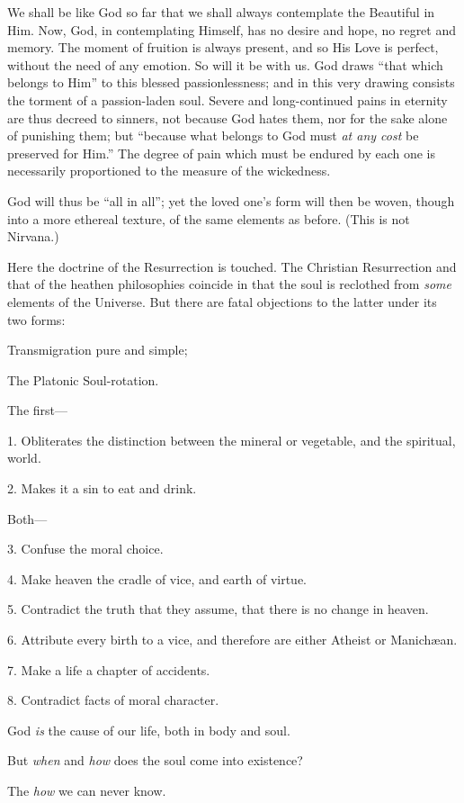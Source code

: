 We shall be like God so far that we shall always contemplate the Beautiful in Him. Now, God, in contemplating Himself, has no desire and hope, no regret and memory. The moment of fruition is always present, and so His Love is perfect, without the need of any emotion. So will it be with us. God draws “that which belongs to Him” to this blessed passionlessness; and in this very drawing consists the torment of a passion-laden soul. Severe and long-continued pains in eternity are thus decreed to sinners, not because God hates them, nor for the sake alone of punishing them; but “because what belongs to God must \emph{at any cost} be preserved for Him.” The degree of pain which must be endured by each one is necessarily proportioned to the measure of the wickedness.

God will thus be “all in all”; yet the loved one’s form will then be woven, though into a more ethereal texture, of the same elements as before. (This is not Nirvana.)

Here the doctrine of the Resurrection is touched. The Christian Resurrection and that of the heathen philosophies coincide in that the soul is reclothed from \emph{some} elements of the Universe. But there are fatal objections to the latter under its two forms:

Transmigration pure and simple;

The Platonic Soul-rotation.

The first—

1. Obliterates the distinction between the mineral or vegetable, and the spiritual, world.

2. Makes it a sin to eat and drink.

Both—

3. Confuse the moral choice.

4. Make heaven the cradle of vice, and earth of virtue.

5. Contradict the truth that they assume, that there is no change in heaven.

6. Attribute every birth to a vice, and therefore are either Atheist or Manichæan.

7. Make a life a chapter of accidents.

8. Contradict facts of moral character.

God \emph{is} the cause of our life, both in body and soul.

But \emph{when} and \emph{how} does the soul come into existence?

The \emph{how} we can never know.

